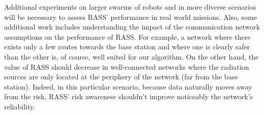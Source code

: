 Additional experiments on larger swarms of robots and in more diverse scenarios will be necessary to assess RASS' performance in real world missions. Also, some additional work includes understanding the impact of the communication network assumptions on the performance of RASS. For example, a network where there exists only a few routes towards the base station and where one is clearly safer than the other is, of course, well suited for our algorithm. On the other hand, the value of RASS should decrease in well-connected networks where the radiation sources are only located at the periphery of the network (far from the base station). Indeed, in this particular scenario, because data naturally moves away from the risk, RASS' risk awareness shouldn't improve noticeably the network's reliability.


